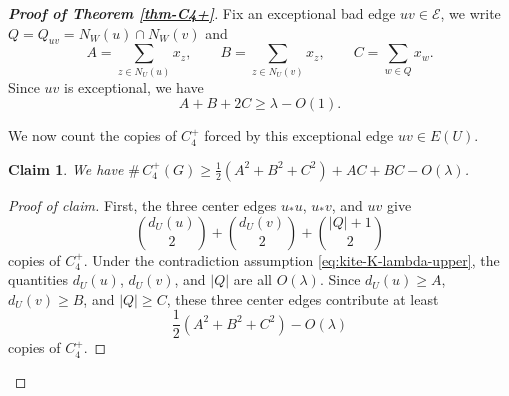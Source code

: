 \documentclass[10pt,a4paper]{amsart}
\newtheorem{claim}[theorem]{Claim}
\renewcommand{\ge}{\geqslant}
\begin{document}
\begin{proof}[{\bf Proof of Theorem \ref{thm-C4+}}]
 Fix an exceptional bad
edge \(uv\in\mathcal E\), we write 
$ Q=Q_{uv}=N_W(u)\cap N_W(v)$ 
and 
\[
        A=\sum_{z\in N_U(u)}x_z,
        \qquad
        B=\sum_{z\in N_U(v)}x_z,
        \qquad
        C=\sum_{w\in Q}x_w.
\]
Since \(uv\) is exceptional, we have 
\begin{equation}\label{eq:kite-exceptional-ABC}
        A+B+2C\ge \lambda-O(1).
\end{equation}

We now count the copies of \(C_4^+\) forced by this exceptional edge $uv\in E(U)$.  

\begin{claim} \label{cl:lower-copies}
    We have $\texttt{\#}\, C_4^+(G) \ge
        \frac12(A^2+B^2+C^2)+AC+BC-O(\lambda) $. 
\end{claim}


\begin{proof}[Proof of claim]
First,
the three center edges \(u_*u\), \(u_*v\), and \(uv\) give
\[
        {d_U(u)\choose2}
        +
        {d_U(v)\choose2}
        +
        {|Q|+1\choose2}
\]
copies of $C_4^+$.  Under the contradiction assumption \eqref{eq:kite-K-lambda-upper},
the quantities \(d_U(u)\), \(d_U(v)\), and \(|Q| \) are all \(O(\lambda)\).
Since \(d_U(u)\ge A\), \(d_U(v)\ge B\), and \(|Q|\ge C\), these three center
edges contribute at least
\begin{equation}\label{eq:kite-three-centers}
        \frac12(A^2+B^2+C^2)-O(\lambda)
\end{equation}
copies of \(C_4^+\).


\end{proof}
\end{proof}
\end{document}
